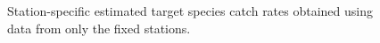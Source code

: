 \documentclass[12pt]{article}\usepackage[]{graphicx}\usepackage[]{color}
\begin{document}
\begin{appendices}
\begin{figure}[htb]
{\centering {} 

}

\caption{Station-specific estimated target species catch rates obtained using data from only the fixed stations.}\label{fig:target-spat-fixed}
\end{figure}
\begin{figure}[htb]

{\centering {} 

}
\end{figure}
\end{appendices}
\end{document}
